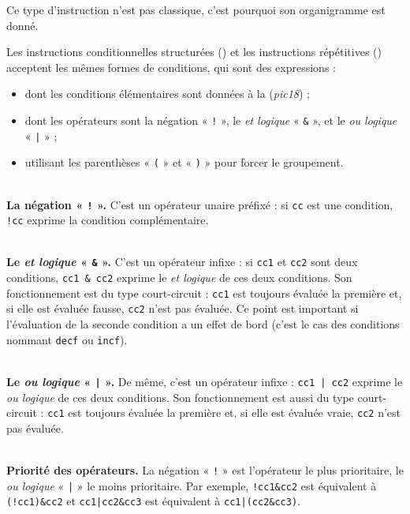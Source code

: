 Ce type d'instruction n'est pas classique, c'est pourquoi son organigramme est donné.







Les instructions conditionnelles structurées () et les instructions répétitives () acceptent les mêmes formes de conditions, qui sont des expressions :\begin{itemize}
  \item dont les conditions élémentaires sont données à la  (\emph{pic18}) ;
  \item dont les opérateurs sont la négation « \texttt{!} », le \emph{et logique} « \texttt{\&} », et le \emph{ou logique} « \texttt{|} » ;
  \item utilisant les parenthèses « \texttt{(} » et « \texttt{)} » pour forcer le groupement.
\end{itemize}

~\\
\textbf{La négation « \texttt{!} ».} C'est un opérateur unaire préfixé : si \texttt{cc} est une condition, \texttt{!cc} exprime la condition complémentaire. %


~\\
\textbf{Le \emph{et logique} « \texttt{\&} ».} C'est un opérateur infixe : si \texttt{cc1} et \texttt{cc2} sont deux conditions, \texttt{cc1 \& cc2} exprime le \emph{et logique} de ces deux conditions. Son fonctionnement est du type court-circuit : \texttt{cc1} est toujours évaluée la première et, si elle est évaluée fausse, \texttt{cc2} n'est pas évaluée. Ce point est important si l'évaluation de la seconde condition a un effet de bord (c'est le cas des conditions nommant \texttt{decf} ou \texttt{incf}).

~\\
\textbf{Le \emph{ou logique} « \texttt{|} ».} De même, c'est un opérateur infixe : \texttt{cc1 | cc2} exprime le \emph{ou logique} de ces deux conditions. Son fonctionnement est aussi du type court-circuit : \texttt{cc1} est toujours évaluée la première et, si elle est évaluée vraie, \texttt{cc2} n'est pas évaluée.

~\\
\textbf{Priorité des opérateurs.} La négation « \texttt{!} » est l'opérateur le plus prioritaire, le \emph{ou logique} « \texttt{|} » le moins prioritaire. Par exemple, \texttt{!cc1\&cc2} est équivalent à \texttt{(!cc1)\&cc2} et \texttt{cc1|cc2\&cc3} est équivalent à \texttt{cc1|(cc2\&cc3)}.

